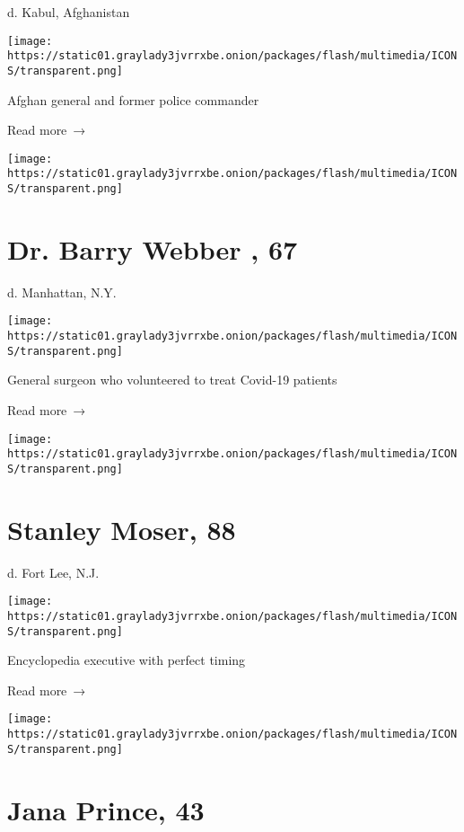 d. Kabul, Afghanistan

\texttt{[image: https://static01.graylady3jvrrxbe.onion/packages/flash/multimedia/ICONS/transparent.png]}

Afghan general and former police commander

 Read more~→

\href{https://www.nytimes3xbfgragh.onion/2020/05/06/obituaries/Dr-barry-webber-dead-coronavirus.html}{}

\texttt{[image: https://static01.graylady3jvrrxbe.onion/packages/flash/multimedia/ICONS/transparent.png]}

\hypertarget{dr-barry-webber--67}{%
\section{Dr. Barry Webber , 67}\label{dr-barry-webber--67}}

d. Manhattan, N.Y.

\texttt{[image: https://static01.graylady3jvrrxbe.onion/packages/flash/multimedia/ICONS/transparent.png]}

General surgeon who volunteered to treat Covid-19 patients

 Read more~→

\href{https://www.nytimes3xbfgragh.onion/2020/05/06/obituaries/Stanley-Moser-dead-coronavirus.html}{}

\texttt{[image: https://static01.graylady3jvrrxbe.onion/packages/flash/multimedia/ICONS/transparent.png]}

\hypertarget{stanley-moser-88}{%
\section{Stanley Moser, 88}\label{stanley-moser-88}}

d. Fort Lee, N.J.

\texttt{[image: https://static01.graylady3jvrrxbe.onion/packages/flash/multimedia/ICONS/transparent.png]}

Encyclopedia executive with perfect timing

 Read more~→

\href{https://www.nytimes3xbfgragh.onion/2020/05/06/obituaries/jana-prince-dead-coronavirus.html}{}

\texttt{[image: https://static01.graylady3jvrrxbe.onion/packages/flash/multimedia/ICONS/transparent.png]}

\hypertarget{jana-prince-43}{%
\section{Jana Prince, 43}\label{jana-prince-43}}

